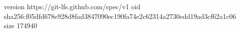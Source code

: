 version https://git-lfs.github.com/spec/v1
oid sha256:f05dfd678e928d8fad3847090ec190fa74e2c62314a2730edd19ad3cf62a1c06
size 174940
